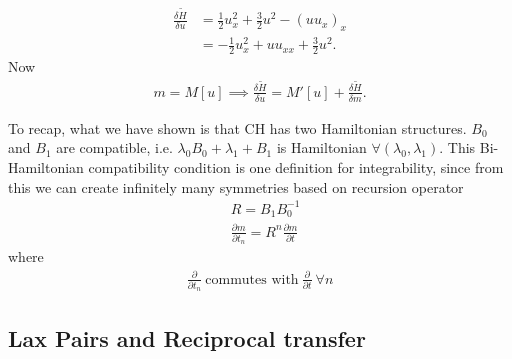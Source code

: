 \documentclass[12pt,reqno]{amsart}
\numberwithin{equation}{section}  %
\newcommand{\p}{\partial}
\begin{document}
\begin{enumerate}
\begin{equation*}
      \begin{split}
	\frac{\delta \tilde{H}}{\delta u}
	& = \frac{1}{2} u_{x}^{2} + \frac{3}{2}
	u^{2} - (u u_{x})_{x}
	\\
	& = -\frac{1}{2} u_{x}^{2} + u u_{xx} + \frac{3}{2} u^{2}.
      \end{split}
    \end{equation*}
    Now
    \begin{equation*}
      \begin{split}
	m = M[u] \implies \frac{\delta \tilde{H}}{\delta u} = M'[u] + \frac{\delta
	  \tilde{H}}{\delta m}. 
	\end{split}
      \end{equation*}
  \end{enumerate}
  To recap, what we have shown is that CH has two Hamiltonian structures.
  $B_{0}$ and $B_{1}$ are compatible, i.e. $\lambda_{0} B_{0} +
  \lambda_{1} + B_{1}$ is Hamiltonian $\forall (\lambda_{0}, \lambda_{1})$. This
  Bi-Hamiltonian compatibility condition is one definition for integrability,
  since from this we can create infinitely many symmetries based on recursion
  operator
%
%
  \begin{equation*}
    \begin{split}
      &  R = B_{1} B_{0}^{-1}
      \\
      & \frac{\p m}{\p t_{n}} = R^{n} \frac{\p m}{\p t}
    \end{split}
  \end{equation*}
%
%
  where %
%
  \begin{equation*}
    \begin{split}
      \frac{\p}{\p t_{n}} \ \text{commutes with} \ \frac{\p}{\p t} \ \forall n
    \end{split}
  \end{equation*}
%
%
  \subsection{Lax Pairs and Reciprocal transfer} 
%
%
\end{document}
